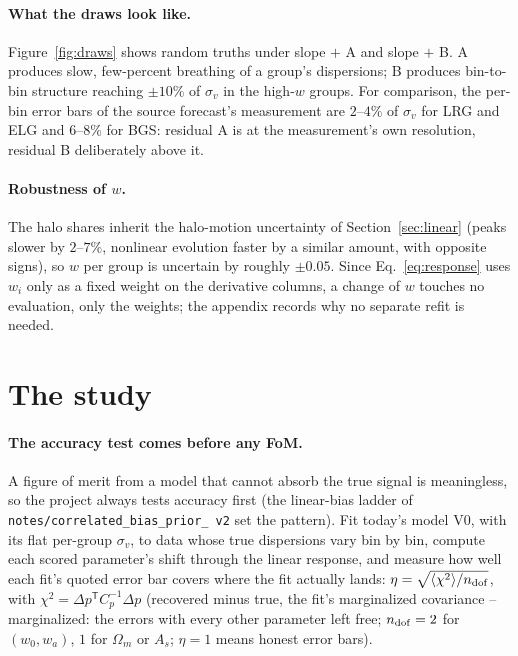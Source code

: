 \documentclass[11pt]{article}
\newcommand{\sv}{\sigma_v}
\newcommand{\chidof}{\sqrt{\langle\chi^2\rangle/n_{\rm dof}}}
\newcommand{\us}{\_\allowbreak}
\begin{document}
\paragraph{What the draws look like.}
Figure~\ref{fig:draws} shows random truths under slope $+$ A and
slope $+$ B.  A produces slow, few-percent breathing of a group's
dispersions; B produces bin-to-bin structure reaching $\pm 10\%$ of
$\sv$ in the high-$w$ groups.  For comparison, the per-bin error bars
of the source forecast's measurement are $2$--$4\%$ of $\sv$ for LRG
and ELG and $6$--$8\%$ for BGS: residual A is at the measurement's
own resolution, residual B deliberately above it.

\paragraph{Robustness of $w$.}
The halo shares inherit the halo-motion uncertainty of
Section~\ref{sec:linear} (peaks slower by $2$--$7\%$, nonlinear
evolution faster by a similar amount, with opposite signs), so $w$
per group is uncertain by roughly $\pm 0.05$.  Since
Eq.~\eqref{eq:response} uses $w_i$ only as a fixed weight on the
derivative columns, a change of $w$ touches no evaluation, only the
weights; the appendix records why no separate refit is needed.

\section{The study}
\label{sec:study}

\paragraph{The accuracy test comes before any FoM.}
A figure of merit from a model that cannot absorb the true signal is
meaningless, so the project always tests accuracy first (the
linear-bias ladder of \texttt{notes/correlated\us bias\us prior\us
v2} set the pattern).  Fit today's model V0, with its flat per-group
$\sv$, to data whose true dispersions vary bin by bin, compute each
scored parameter's shift through the linear response, and measure how
well each fit's quoted error bar covers where the fit actually lands:
$\eta = \chidof$, with
$\chi^2 = \Delta p^{\mathsf T} C_p^{-1} \Delta p$ (recovered minus
true, the fit's marginalized covariance -- marginalized: the errors
with every other parameter left free; $n_{\rm dof} = 2$ for
$(w_0, w_a)$, $1$ for $\Omega_m$ or $A_s$; $\eta = 1$ means honest
error bars).
\end{document}
